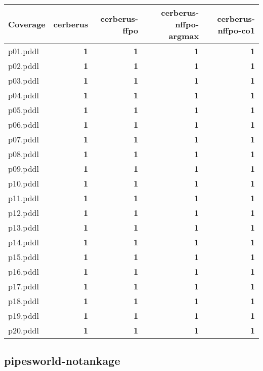 \documentclass{article}
\begin{document}
\begin{tabular}{@{}lrrrr@{}}
Coverage & cerberus & cerberus-ffpo & cerberus-nffpo-argmax & cerberus-nffpo-co1 \\
\midrule
p01.pddl & \textbf{1} & \textbf{1} & \textbf{1} & \textbf{1} \\
p02.pddl & \textbf{1} & \textbf{1} & \textbf{1} & \textbf{1} \\
p03.pddl & \textbf{1} & \textbf{1} & \textbf{1} & \textbf{1} \\
p04.pddl & \textbf{1} & \textbf{1} & \textbf{1} & \textbf{1} \\
p05.pddl & \textbf{1} & \textbf{1} & \textbf{1} & \textbf{1} \\
p06.pddl & \textbf{1} & \textbf{1} & \textbf{1} & \textbf{1} \\
p07.pddl & \textbf{1} & \textbf{1} & \textbf{1} & \textbf{1} \\
p08.pddl & \textbf{1} & \textbf{1} & \textbf{1} & \textbf{1} \\
p09.pddl & \textbf{1} & \textbf{1} & \textbf{1} & \textbf{1} \\
p10.pddl & \textbf{1} & \textbf{1} & \textbf{1} & \textbf{1} \\
p11.pddl & \textbf{1} & \textbf{1} & \textbf{1} & \textbf{1} \\
p12.pddl & \textbf{1} & \textbf{1} & \textbf{1} & \textbf{1} \\
p13.pddl & \textbf{1} & \textbf{1} & \textbf{1} & \textbf{1} \\
p14.pddl & \textbf{1} & \textbf{1} & \textbf{1} & \textbf{1} \\
p15.pddl & \textbf{1} & \textbf{1} & \textbf{1} & \textbf{1} \\
p16.pddl & \textbf{1} & \textbf{1} & \textbf{1} & \textbf{1} \\
p17.pddl & \textbf{1} & \textbf{1} & \textbf{1} & \textbf{1} \\
p18.pddl & \textbf{1} & \textbf{1} & \textbf{1} & \textbf{1} \\
p19.pddl & \textbf{1} & \textbf{1} & \textbf{1} & \textbf{1} \\
p20.pddl & \textbf{1} & \textbf{1} & \textbf{1} & \textbf{1} \\
\end{tabular}

\hypertarget{coverage-pipesworld-notankage}{}
\subsection*{pipesworld-notankage}
\end{document}
